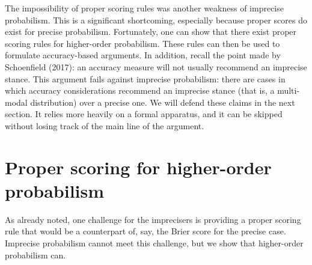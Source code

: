 \documentclass[
  letterpaper,
  DIV=11,
  numbers=noendperiod]{scrartcl}
\begin{document}
The impossibility of proper scoring rules was another weakness of
imprecise probabilism. This is a significant shortcoming, especially
because proper scores do exist for precise probabilism. Fortunately, one
can show that there exist proper scoring rules for higher-order
probabilism. These rules can then be used to formulate accuracy-based
arguments. In addition, recall the point made by Schoenfield (2017): an
accuracy measure will not usually recommend an imprecise stance. This
argument fails against imprecise probabilism: there are cases in which
accuracy considerations recommend an imprecise stance (that is, a
multi-modal distribution) over a precise one. We will defend these
claims in the next section. It relies more heavily on a formal
apparatus, and it can be skipped without losing track of the main line
of the argument.

\hypertarget{proper-scoring-for-higher-order-probabilism}{%
\section{Proper scoring for higher-order
probabilism}\label{proper-scoring-for-higher-order-probabilism}}

\label{sec:proper-scores}

As already noted, one challenge for the imprecisers is providing a
proper scoring rule that would be a counterpart of, say, the Brier score
for the precise case. Imprecise probabilism cannot meet this challenge,
but we show that higher-order probabilism can.
\end{document}
